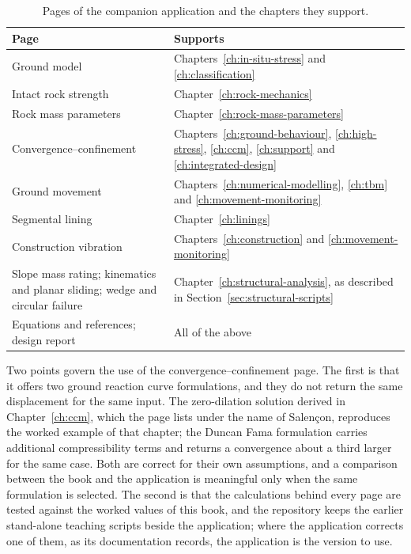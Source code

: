 \begin{table}[htbp]
\caption{Pages of the companion application and the chapters they support.}
\label{tab:companion-scripts}
\centering
\small
\begin{tabularx}{\textwidth}{>{\raggedright\arraybackslash}p{} X}
\toprule
\textbf{Page} & \textbf{Supports} \\
\midrule
Ground model & Chapters~\ref{ch:in-situ-stress} and \ref{ch:classification} \\
Intact rock strength & Chapter~\ref{ch:rock-mechanics} \\
Rock mass parameters & Chapter~\ref{ch:rock-mass-parameters} \\
Convergence--confinement & Chapters~\ref{ch:ground-behaviour}, \ref{ch:high-stress}, \ref{ch:ccm}, \ref{ch:support} and \ref{ch:integrated-design} \\
Ground movement & Chapters~\ref{ch:numerical-modelling}, \ref{ch:tbm} and \ref{ch:movement-monitoring} \\
Segmental lining & Chapter~\ref{ch:linings} \\
Construction vibration & Chapters~\ref{ch:construction} and \ref{ch:movement-monitoring} \\
Slope mass rating; kinematics and planar sliding; wedge and circular failure & Chapter~\ref{ch:structural-analysis}, as described in Section~\ref{sec:structural-scripts} \\
Equations and references; design report & All of the above \\
\bottomrule
\end{tabularx}
\end{table}

Two points govern the use of the convergence--confinement page. The first is
that it offers two ground reaction curve formulations, and they do not return
the same displacement for the same input. The zero-dilation solution derived
in Chapter~\ref{ch:ccm}, which the page lists under the name of
Salen\c{c}on, reproduces the worked example of that chapter; the Duncan Fama
formulation carries additional compressibility terms and returns a convergence
about a third larger for the same case. Both are correct for their own
assumptions, and a comparison between the book and the application is
meaningful only when the same formulation is selected. The second is that the
calculations behind every page are tested against the worked values of this
book, and the repository keeps the earlier stand-alone teaching scripts beside
the application; where the application corrects one of them, as its
documentation records, the application is the version to use.

